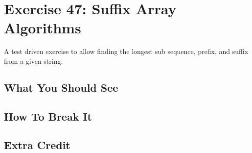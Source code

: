 \chapter{Exercise 47: Suffix Array Algorithms}

A test driven exercise to allow finding the longest sub sequence, prefix, and suffix from a given
string.


\section{What You Should See}


\section{How To Break It}


\section{Extra Credit}



